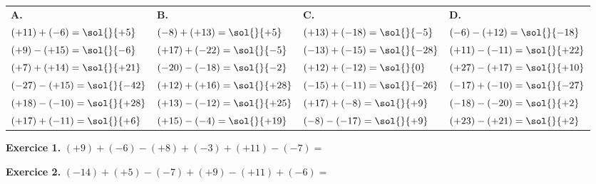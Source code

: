 

{\small
\bigskip
\def\arraystretch{1.7}
\begin{tabularx}{\linewidth}{*{4}{X}}
\textbf{A.} & \textbf{B.} & \textbf{C.} & \textbf{D.} \\
$(+11)+(-6)= \sol{\dotfill}{+5}$   & $(-8)+(+13)= \sol{\dotfill}{+5}$   & $(+13)+(-18)= \sol{\dotfill}{-5}$ & $(-6)-(+12)= \sol{\dotfill}{-18}$   \\
$(+9)-(+15)= \sol{\dotfill}{-6}$  & $(+17)+(-22)= \sol{\dotfill}{-5}$ & $(-13)+(-15)= \sol{\dotfill}{-28}$ & $(+11)-(-11)= \sol{\dotfill}{+22}$   \\
$(+7)+(+14)= \sol{\dotfill}{+21}$  & $(-20)-(-18)= \sol{\dotfill}{-2}$ & $(+12)+(-12)= \sol{\dotfill}{0}$   & $(+27)-(+17)= \sol{\dotfill}{+10}$ \\
$(-27)-(+15)= \sol{\dotfill}{-42}$ & $(+12)+(+16)= \sol{\dotfill}{+28}$  & $(-15)+(-11)= \sol{\dotfill}{-26}$  & $(-17)+(-10)= \sol{\dotfill}{-27}$  \\
$(+18)-(-10)= \sol{\dotfill}{+28}$  & $(+13)-(-12)= \sol{\dotfill}{+25}$  & $(+17)+(-8)= \sol{\dotfill}{+9}$  & $(-18)-(-20)= \sol{\dotfill}{+2}$ \\
$(+17)+(-11)= \sol{\dotfill}{+6}$  & $(+15)-(-4)= \sol{\dotfill}{+19}$  & $(-8)-(-17)= \sol{\dotfill}{+9}$  & $(+23)-(+21)= \sol{\dotfill}{+2}$ \\
\end{tabularx}
}


{\bfseries\color{themeColor}Exercice 1.} \quad$(+9) + (-6) - (+8) + (-3) + (+11) - (-7) =$


{\bfseries\color{themeColor}Exercice 2.} \quad$(-14) + (+5) - (-7) + (+9) - (+11) + (-6) =$

